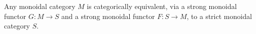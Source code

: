 Any monoidal category $M$ is categorically equivalent, via a strong monoidal functor $G : M \rightarrow S$ and a strong monoidal functor $F : S \rightarrow M$, to a strict monoidal category $S$.
